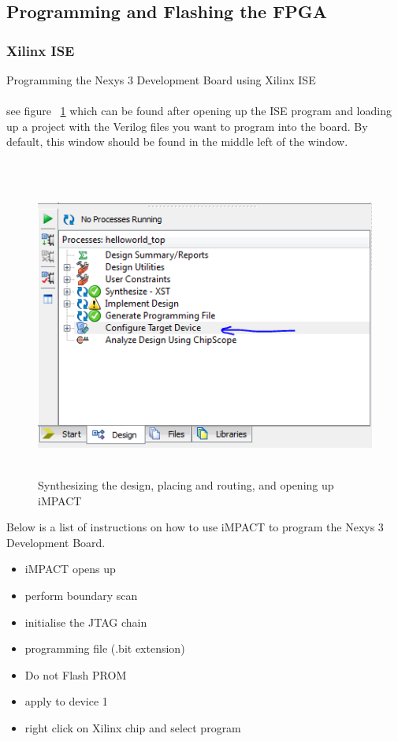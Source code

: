 \documentclass[10pt,a4paper]{article}
\begin{document}
\subsection{Programming and Flashing the FPGA}
\subsubsection{Xilinx ISE}
Programming the Nexys 3 Development Board using Xilinx ISE \\ \\
see figure ~\ref{fig:configure_target} which can be found after opening up the ISE program and loading up a project with the Verilog files you want to program into the board. By default, this window should be found in the middle left of the window.\\ \\
\begin{figure}[h!]
	\includegraphics[width=12cm,height=10cm]{configure_device.PNG}
	\caption{Synthesizing the design, placing and routing, and opening up iMPACT}
	\label{fig:configure_target}
\end{figure}

Below is a list of instructions on how to use iMPACT to program the Nexys 3 Development Board.
\begin{itemize}
	\item iMPACT opens up
	\item perform boundary scan
	\item initialise the JTAG chain
	\item programming file (.bit extension)
	\item Do not Flash PROM
	\item apply to device 1
	\item right click on Xilinx chip and select program
\end{itemize}
\end{document}
